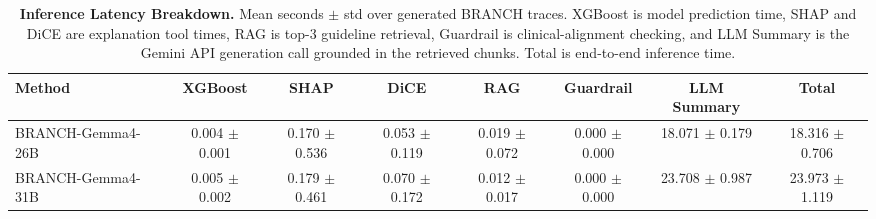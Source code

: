 \begin{table}[ht]
\centering
\caption{\textbf{Inference Latency Breakdown.} Mean seconds $\pm$ std over generated BRANCH traces. XGBoost is model prediction time, SHAP and DiCE are explanation tool times, RAG is top-3 guideline retrieval, Guardrail is clinical-alignment checking, and LLM Summary is the Gemini API generation call grounded in the retrieved chunks. Total is end-to-end inference time.}
\label{tab:latency_breakdown}
\renewcommand{\arraystretch}{1.2}
\begin{tabular}{lccccccc}
\toprule
\textbf{Method} & \textbf{XGBoost} & \textbf{SHAP} & \textbf{DiCE} & \textbf{RAG} & \textbf{Guardrail} & \textbf{LLM Summary} & \textbf{Total} \\
\midrule
BRANCH-Gemma4-26B & 0.004 $\pm$ 0.001 & 0.170 $\pm$ 0.536 & 0.053 $\pm$ 0.119 & 0.019 $\pm$ 0.072 & 0.000 $\pm$ 0.000 & 18.071 $\pm$ 0.179 & 18.316 $\pm$ 0.706 \\
BRANCH-Gemma4-31B & 0.005 $\pm$ 0.002 & 0.179 $\pm$ 0.461 & 0.070 $\pm$ 0.172 & 0.012 $\pm$ 0.017 & 0.000 $\pm$ 0.000 & 23.708 $\pm$ 0.987 & 23.973 $\pm$ 1.119 \\
\bottomrule
\end{tabular}
\end{table}
